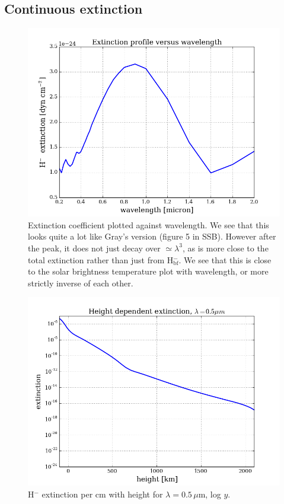 \documentclass{article}
\begin{document}
\subsection{Continuous extinction}
\begin{figure}[H]
  \centering
  \includegraphics[scale=0.5]{../figures/task2/exthmin_lam_kappa.png}
  \caption{Extinction coefficient plotted against wavelength. We see that this looks quite a lot like Gray's version (figure 5 in SSB). However after the peak, it does not just decay over $\simeq \lambda^3$, as is more close to the total extinction rather than just from H$_{\text{bf}}^-$. We see that this is close to the solar brightness temperature plot with wavelength, or more strictly inverse of each other.}
\end{figure}

\begin{figure}[H]
  \centering
  \includegraphics[scale=0.5]{../figures/task2/exthmin_2.png}
  \caption{H${^-}$ extinction per cm with height for $\lambda = 0.5\,\mu$m, log $y$.}
\end{figure}
\end{document}
